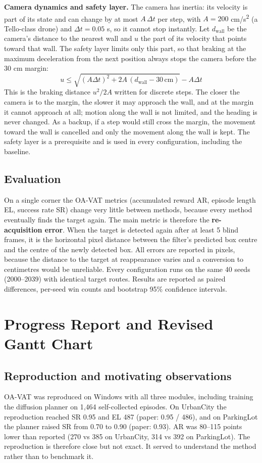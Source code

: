 \documentclass[12pt,a4paper]{article}
\begin{document}
\textbf{Camera dynamics and safety layer.} The camera has inertia: its velocity is part of its state and can change by at most $A\,\Delta t$ per step, with $A = 200$ cm/s\textsuperscript{2} (a Tello-class drone) and $\Delta t = 0.05$ s, so it cannot stop instantly. Let $d_{\mathrm{wall}}$ be the camera's distance to the nearest wall and $u$ the part of its velocity that points toward that wall. The safety layer limits only this part, so that braking at the maximum deceleration from the next position always stops the camera before the 30 cm margin:
\begin{equation}
  u \le \sqrt{(A\Delta t)^2 + 2A\,(d_{\mathrm{wall}} - 30\,\mathrm{cm})} - A\Delta t
\end{equation}
This is the braking distance $u^2/2A$ written for discrete steps. The closer the camera is to the margin, the slower it may approach the wall, and at the margin it cannot approach at all; motion along the wall is not limited, and the heading is never changed. As a backup, if a step would still cross the margin, the movement toward the wall is cancelled and only the movement along the wall is kept. The safety layer is a prerequisite and is used in every configuration, including the baseline.

\subsection{Evaluation}
On a single corner the OA-VAT metrics (accumulated reward AR, episode length EL, success rate SR) change very little between methods, because every method eventually finds the target again. The main metric is therefore the \textbf{re-acquisition error}. When the target is detected again after at least 5 blind frames, it is the horizontal pixel distance between the filter’s predicted box centre and the centre of the newly detected box. All errors are reported in pixels, because the distance to the target at reappearance varies and a conversion to centimetres would be unreliable. Every configuration runs on the same 40 seeds (2000–2039) with identical target routes. Results are reported as paired differences, per-seed win counts and bootstrap 95\% confidence intervals.

\section{Progress Report and Revised Gantt Chart}
\subsection{Reproduction and motivating observations}
OA-VAT was reproduced on Windows with all three modules, including training the diffusion planner on 1,464 self-collected episodes. On UrbanCity the reproduction reached SR 0.95 and EL 487 (paper: 0.95 / 486), and on ParkingLot the planner raised SR from 0.70 to 0.90 (paper: 0.93). AR was 80–115 points lower than reported (270 vs 385 on UrbanCity, 314 vs 392 on ParkingLot). The reproduction is therefore close but not exact. It served to understand the method rather than to benchmark it.
\end{document}
